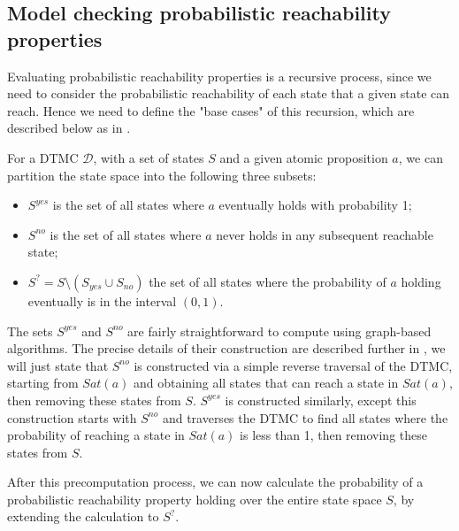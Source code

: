 \subsection{Model checking probabilistic reachability properties}
\label{back:check-reach}

Evaluating probabilistic reachability properties is a recursive process, since we need to consider the probabilistic reachability of each state that a given state can reach. Hence we need to define the "base cases" of this recursion, which are described below as in \cite{kwiatkowska_stochastic_2007}. %

\begin{definition}
\label{back:S_yes}

    For a DTMC $\mathcal{D}$, with a set of states $S$ and a given atomic proposition $a$, we can partition the state space into the following three subsets:

    \begin{itemize}
        
        \item $S^{yes}$ is the set of all states where $a$ eventually holds with probability 1;
        \item $S^{no}$ is the set of all states where $a$ never holds in any subsequent reachable state;
        \item $S^{?} = S \setminus (S_{yes} \cup S_{no})$ the set of all states where the probability of $a$ holding eventually is in the interval $(0,1)$.

    \end{itemize}

\end{definition}

The sets $S^{yes}$ and $S^{no}$ are fairly straightforward to compute using graph-based algorithms. The precise details of their construction are described further in \cite{kwiatkowska_stochastic_2007}, we will just state that $S^{no}$ is constructed via a simple reverse traversal of the DTMC, starting from $Sat(a)$ and obtaining all states that can reach a state in $Sat(a)$, then removing these states from $S$. $S^{yes}$ is constructed similarly, except this construction starts with $S^{no}$ and traverses the DTMC to find all states where the probability of reaching a state in $Sat(a)$ is less than 1, then removing these states from $S$.

After this precomputation process, we can now calculate the probability of a probabilistic reachability property holding over the entire state space $S$, by extending the calculation to $S^{?}$.

